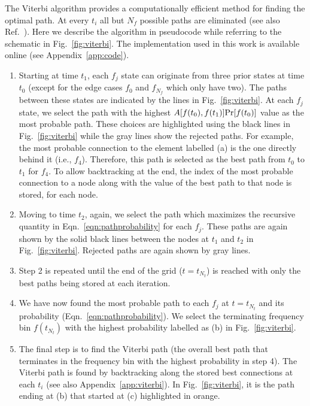 \documentclass[paper-main.tex]{subfiles}
\begin{document}
The Viterbi algorithm provides a computationally efficient method for finding the optimal path. 
At every $t_i$ all but $N_f$ possible paths are eliminated (see also Ref.~\cite{ScoX1ViterbiO1:2017}). 
Here we describe the algorithm in pseudocode while referring to the schematic in Fig.~\ref{fig:viterbi}.%
The implementation used in this work is available online (see Appendix~\ref{app:code}).
\begin{enumerate}
\item Starting at time $t_1$, each $f_j$ state can originate from three prior states at time $t_0$ (except for the edge cases $f_0$ and $f_{N_f}$ which only have two). 
The paths between these states are indicated by the lines in Fig.~\ref{fig:viterbi}. 
At each $f_j$ state, we select the path with the highest $A[f(t_0),f(t_1)] {\rm Pr}[f(t_0)]$ value as the most probable path. 
These choices are highlighted using the black lines in Fig.~\ref{fig:viterbi} while the gray lines show the rejected paths. 
For example, the most probable connection to the element labelled (a) is the one directly behind it (i.e., $f_4$). 
Therefore, this path is selected as the best path from $t_0$ to $t_1$ for $f_4$.
To allow backtracking at the end, the index of the most probable connection to a node along with the value of the best path to that node is stored, for each node.

\item Moving to time $t_2$, again, we select the path which maximizes the recursive quantity in Eqn.~\ref{eqn:pathprobability} for each $f_j$. 
These paths are again shown by the solid black lines between the nodes at $t_1$ and $t_2$ in Fig.~\ref{fig:viterbi}.
Rejected paths are again shown by gray lines. 

\item Step 2 is repeated until the end of the grid ($t=t_{N_t}$) is reached with only the best paths being stored at each iteration. 

\item We have now found the most probable path to each $f_j$ at $t=t_{N_t}$ and its probability (Eqn.~\ref{eqn:pathprobability}). 
We select the terminating frequency bin $f(t_{N_t})$ with the highest probability labelled as (b) in Fig.~\ref{fig:viterbi}.

\item The final step is to find the Viterbi path (the overall best path that terminates in the frequency bin with the highest probability in step 4). 
The Viterbi path is found by backtracking along the stored best connections at each $t_i$ (see also Appendix~\ref{app:viterbi}). 
In Fig.~\ref{fig:viterbi}, it is the path ending at (b) that started at (c) highlighted in orange.
\end{enumerate}
\end{document}
